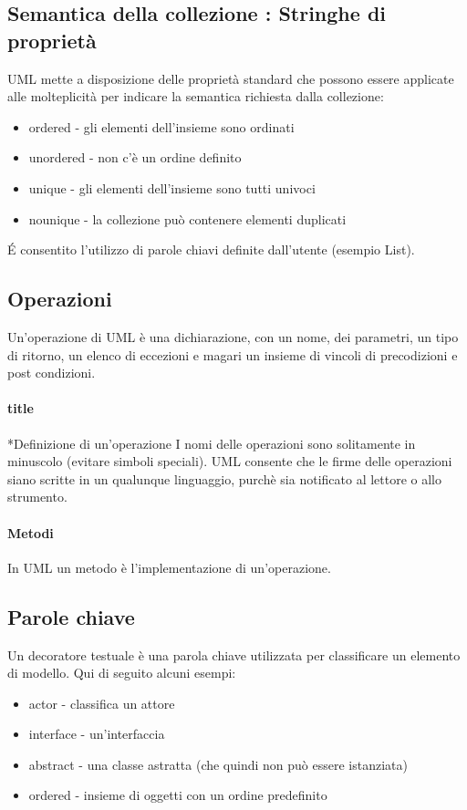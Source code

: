 \subsection{Semantica della collezione : Stringhe di proprietà}
UML mette a disposizione delle proprietà standard che possono essere applicate alle
molteplicità per indicare la semantica richiesta dalla collezione:
\begin{itemize}
    \item ordered - gli elementi dell'insieme sono ordinati
    \item unordered - non c'è un ordine definito
    \item unique - gli elementi dell'insieme sono tutti univoci
    \item nounique - la collezione può contenere elementi duplicati
\end{itemize}
\'E consentito l'utilizzo di parole chiavi definite dall'utente (esempio List).
\subsection{Operazioni}
Un'operazione di UML è una dichiarazione, con un nome, dei parametri, un tipo di ritorno,
un elenco di eccezioni e magari un insieme di vincoli di precodizioni e post condizioni.
\paragraph*{title}*{Definizione di un'operazione}
I nomi delle operazioni sono solitamente in minuscolo (evitare simboli speciali).
UML consente che le firme delle operazioni siano scritte in un qualunque linguaggio, 
purchè sia notificato al lettore o allo strumento.
\paragraph*{Metodi}
In UML un metodo è l'implementazione di un'operazione.
\subsection*{Parole chiave}
Un decoratore testuale è una parola chiave utilizzata per classificare un elemento
di modello. Qui di seguito alcuni esempi:
\begin{itemize}
    \item actor - classifica un attore
    \item interface - un'interfaccia
    \item abstract - una classe astratta (che quindi non può essere istanziata)
    \item ordered - insieme di oggetti con un ordine predefinito
\end{itemize}
